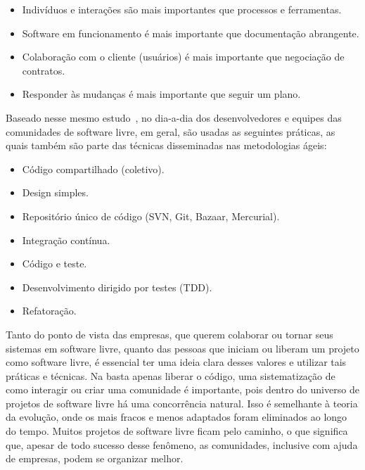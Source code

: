 \begin{itemize}

\item {Indivíduos e interações são mais importantes que processos e ferramentas.}

\item {Software em funcionamento é mais importante que documentação abrangente.}

\item {Colaboração com o cliente (usuários) é mais importante que negociação de contratos.}

\item {Responder às mudanças é mais importante que seguir um plano.}

\end{itemize}

Baseado nesse mesmo estudo~\cite{corbucci:2011}, no dia-a-dia dos desenvolvedores
e equipes das comunidades de software livre, em geral, são usadas as seguintes práticas,
as quais também são parte das técnicas disseminadas nas metodologias ágeis:

\begin{itemize}

\item {Código compartilhado (coletivo).}
\item {Design simples.}
\item {Repositório único de código (SVN, Git, Bazaar, Mercurial).}
\item {Integração contínua.}
\item {Código e teste.}
\item {Desenvolvimento dirigido por testes (TDD).}
\item {Refatoração.}

\end{itemize}

Tanto do ponto de vista das empresas, que querem colaborar ou
tornar seus sistemas em software livre, quanto das pessoas que iniciam ou
liberam um projeto como software livre, é essencial ter uma ideia clara
desses valores e utilizar tais práticas e técnicas.
%
Na basta apenas liberar o código, uma sistematização de como interagir ou
criar uma comunidade é importante, pois dentro do universo de projetos de
software livre há uma concorrência natural.
%
Isso é semelhante à teoria da evolução, onde os mais
fracos e menos adaptados foram eliminados ao longo do tempo. Muitos
projetos de software livre ficam pelo caminho, o que significa que,
apesar de todo sucesso desse fenômeno, as comunidades, inclusive com
ajuda de empresas, podem se organizar melhor.


